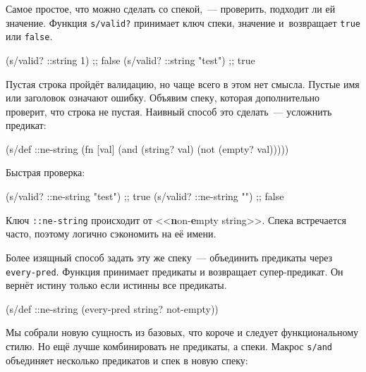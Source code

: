 
Самое простое, что можно сделать со спекой,~--- проверить, подходит ли ей
значение. Функция \verb|s/valid?| принимает ключ спеки, значение и~возвращает
\verb|true| или \verb|false|.

\begin{english}
  \begin{clojure}
(s/valid? ::string 1)      ;; false
(s/valid? ::string "test") ;; true
  \end{clojure}
\end{english}

Пустая строка пройдёт валидацию, но чаще всего в этом нет смысла. Пустые имя или
заголовок означают ошибку. Объявим спеку, которая дополнительно проверит, что
строка не пустая. Наивный способ это сделать~--- усложнить предикат:


\begin{english}
  \begin{clojure}
(s/def ::ne-string
  (fn [val]
    (and (string? val)
         (not (empty? val)))))
  \end{clojure}
\end{english}

\noindent
Быстрая проверка:

\begin{english}
  \begin{clojure}
(s/valid? ::ne-string "test") ;; true
(s/valid? ::ne-string "")     ;; false
  \end{clojure}
\end{english}

Ключ \verb|::ne-string| происходит от <<\textbf{n}on-\textbf{e}mpty
string>>. Спека встречается часто, поэтому логично сэкономить на её имени.

Более изящный способ задать эту же спеку~--- объединить предикаты через
\verb|every-pred|. Функция принимает предикаты и возвращает супер-предикат. Он
вернёт истину только если истинны все предикаты.

\begin{english}
  \begin{clojure}
(s/def ::ne-string
  (every-pred string? not-empty))
  \end{clojure}
\end{english}


Мы собрали новую сущность из базовых, что короче и следует функциональному
стилю. Но ещё лучше комбинировать не предикаты, а спеки. Макрос \verb|s/and|
объединяет несколько предикатов и спек в новую спеку:

